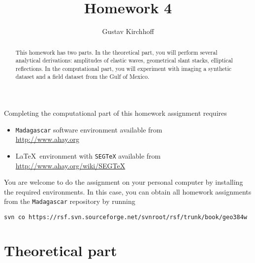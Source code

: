 \author{Gustav Kirchhoff} 
\title{Homework 4}

\begin{abstract}
  This homework has two parts. In the theoretical part, you will
  perform several analytical derivations: amplitudes of elastic waves,
  geometrical slant stacks, elliptical reflections. In the
  computational part, you will experiment with imaging a synthetic
  dataset and a field dataset from the Gulf of Mexico.
\end{abstract}

Completing the computational part of this homework assignment requires
\begin{itemize}
\item \texttt{Madagascar} software environment available from \\
  \url{http://www.ahay.org}
\item \LaTeX\ environment with \texttt{SEGTeX} available from \\ 
  \url{http://www.ahay.org/wiki/SEGTeX}
\end{itemize}

You are welcome to do the assignment on your personal computer by
installing the required environments. In this case, you can obtain all
homework assignments from the \texttt{Madagascar} repository by running
\begin{verbatim}
svn co https://rsf.svn.sourceforge.net/svnroot/rsf/trunk/book/geo384w 
\end{verbatim}

\section{Theoretical part}

